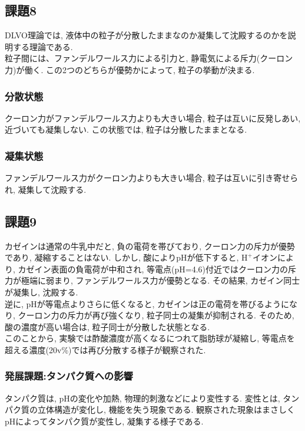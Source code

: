 \documentclass[11pt]{ltjsarticle}
\begin{document}
    \subsection*{課題8}
      DLVO理論では, 液体中の粒子が分散したままなのか凝集して沈殿するのかを説明する理論である.\\
      粒子間には、ファンデルワールス力による引力と, 静電気による斥力(クーロン力)が働く. この2つのどちらが優勢かによって, 粒子の挙動が決まる.\\
      \subsubsection*{分散状態}
        クーロン力がファンデルワールス力よりも大きい場合, 粒子は互いに反発しあい, 近づいても凝集しない. この状態では, 粒子は分散したままとなる.\\
      \subsubsection*{凝集状態}
        ファンデルワールス力がクーロン力よりも大きい場合, 粒子は互いに引き寄せられ, 凝集して沈殿する.\\
    \subsection*{課題9}
      カゼインは通常の牛乳中だと, 負の電荷を帯びており, クーロン力の斥力が優勢であり, 凝縮することはない. しかし, 酸によりpHが低下すると, $\mathrm{H^+}$イオンにより, カゼイン表面の負電荷が中和され, 等電点(pH=4.6)付近ではクーロン力の斥力が極端に弱まり, ファンデルワールス力が優勢となる. その結果, カゼイン同士が凝集し, 沈殿する.\\
      逆に, pHが等電点よりさらに低くなると, カゼインは正の電荷を帯びるようになり, クーロン力の斥力が再び強くなり, 粒子同士の凝集が抑制される. そのため, 酸の濃度が高い場合は, 粒子同士が分散した状態となる.\\
      このことから, 実験では酢酸濃度が高くなるにつれて脂肪球が凝縮し, 等電点を超える濃度(20v\%)では再び分散する様子が観察された.\\
    \subsubsection*{発展課題:タンパク質への影響}
      タンパク質は, pHの変化や加熱, 物理的刺激などにより変性する. 変性とは, タンパク質の立体構造が変化し, 機能を失う現象である. 観察された現象はまさしくpHによってタンパク質が変性し, 凝集する様子である.\\
\end{document}
